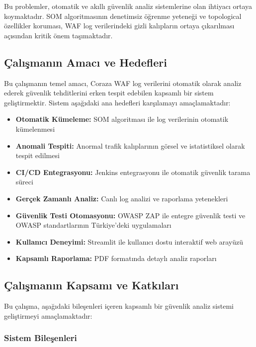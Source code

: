 \newpage

Bu problemler, otomatik ve akıllı güvenlik analiz sistemlerine olan ihtiyacı ortaya koymaktadır. SOM algoritmasının denetimsiz öğrenme yeteneği ve topological özellikler koruması, WAF log verilerindeki gizli kalıpların ortaya çıkarılması açısından kritik önem taşımaktadır.

\subsection{Çalışmanın Amacı ve Hedefleri}

Bu çalışmanın temel amacı, Coraza WAF log verilerini otomatik olarak analiz ederek güvenlik tehditlerini erken tespit edebilen kapsamlı bir sistem geliştirmektir. Sistem aşağıdaki ana hedefleri karşılamayı amaçlamaktadır:

\begin{itemize}
    \item \textbf{Otomatik Kümeleme:} SOM algoritması ile log verilerinin otomatik kümelenmesi \cite{som_network_security2018,ozkan2019som_guvenlik}
\item \textbf{Anomali Tespiti:} Anormal trafik kalıplarının görsel ve istatistiksel olarak tespit edilmesi \cite{vesanto2000som,gultekin2020anomali_tespit}
    \item \textbf{CI/CD Entegrasyonu:} Jenkins entegrasyonu ile otomatik güvenlik tarama süreci \cite{jenkins2023,torun2019jenkinsci}
    \item \textbf{Gerçek Zamanlı Analiz:} Canlı log analizi ve raporlama yetenekleri
    \item \textbf{Güvenlik Testi Otomasyonu:} OWASP ZAP \cite{owasp_zap} ile entegre güvenlik testi ve OWASP standartlarının Türkiye'deki uygulamaları \cite{aydin2021owasp_turkiye}
    \item \textbf{Kullanıcı Deneyimi:} Streamlit ile kullanıcı dostu interaktif web arayüzü \cite{streamlit2023}
    \item \textbf{Kapsamlı Raporlama:} PDF formatında detaylı analiz raporları
\end{itemize}

\subsection{Çalışmanın Kapsamı ve Katkıları}

Bu çalışma, aşağıdaki bileşenleri içeren kapsamlı bir güvenlik analiz sistemi geliştirmeyi amaçlamaktadır:

\subsubsection{Sistem Bileşenleri}

